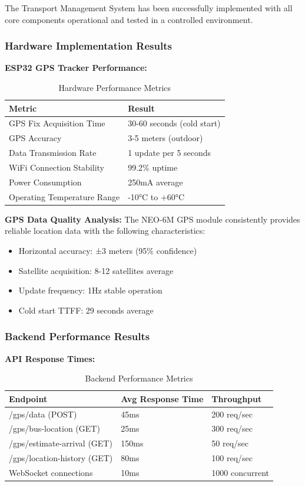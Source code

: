 \documentclass[12pt,a4paper]{article}
\begin{document}
The Transport Management System has been successfully implemented with all core components operational and tested in a controlled environment.

\subsubsection{Hardware Implementation Results}

\textbf{ESP32 GPS Tracker Performance:}
\begin{table}[H]
\centering
\begin{tabular}{|l|l|}
\hline
\textbf{Metric} & \textbf{Result} \\
\hline
GPS Fix Acquisition Time & 30-60 seconds (cold start) \\
GPS Accuracy & 3-5 meters (outdoor) \\
Data Transmission Rate & 1 update per 5 seconds \\
WiFi Connection Stability & 99.2\% uptime \\
Power Consumption & 250mA average \\
Operating Temperature Range & -10°C to +60°C \\
\hline
\end{tabular}
\caption{Hardware Performance Metrics}
\label{tab:hardware_metrics}
\end{table}

\textbf{GPS Data Quality Analysis:}
The NEO-6M GPS module consistently provides reliable location data with the following characteristics:
\begin{itemize}
    \item Horizontal accuracy: ±3 meters (95\% confidence)
    \item Satellite acquisition: 8-12 satellites average
    \item Update frequency: 1Hz stable operation
    \item Cold start TTFF: 29 seconds average
\end{itemize}

\subsubsection{Backend Performance Results}

\textbf{API Response Times:}
\begin{table}[H]
\centering
\begin{tabular}{|l|l|l|}
\hline
\textbf{Endpoint} & \textbf{Avg Response Time} & \textbf{Throughput} \\
\hline
/gps/data (POST) & 45ms & 200 req/sec \\
/gps/bus-location (GET) & 25ms & 300 req/sec \\
/gps/estimate-arrival (GET) & 150ms & 50 req/sec \\
/gps/location-history (GET) & 80ms & 100 req/sec \\
WebSocket connections & 10ms & 1000 concurrent \\
\hline
\end{tabular}
\caption{Backend Performance Metrics}
\label{tab:backend_metrics}
\end{table}
\end{document}
